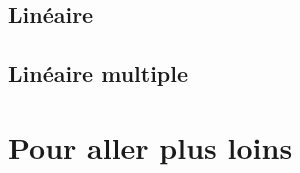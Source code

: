 \documentclass[10.5pt,a4paper]{article}
\begin{document}
  \subsection{Linéaire}
  \subsection{Linéaire multiple}

  
\section{Pour aller plus loins}
 
%
%
\end{document}
